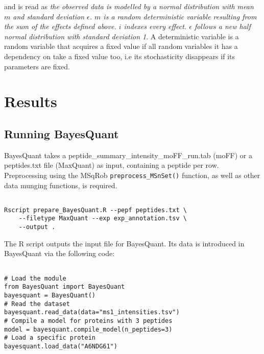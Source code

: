 and is read as \textit{the observed data is modelled by a normal distribution with mean $m$ and standard deviation $\epsilon$. $m$ is a random deterministic variable resulting from the sum of the effects defined above. $i$ indexes every effect. $\epsilon$ follows a new half normal distribution with standard deviation 1}. A deterministic variable is a random variable that acquires a fixed value if all random variables it has a dependency on take a fixed value too, i.e its stochasticity disappears if its parameters are fixed.

\section{Results}


\subsection{Running BayesQuant}

BayesQuant takes a peptide\_summary\_intensity\_moFF\_run.tab (moFF) or a peptides.txt file (MaxQuant) as input, containing a peptide per row. Preprocessing using the MSqRob \texttt{preprocess\_MSnSet()} function, as well as other data munging functions, is required.


\begin{verbatim}

Rscript prepare_BayesQuant.R --pepf peptides.txt \
    --filetype MaxQuant --exp exp_annotation.tsv \
    --output .
\end{verbatim}

The R script outputs the input file for BayesQuant. Its data is introduced in BayesQuant via the following code:

\begin{verbatim}

# Load the module
from BayesQuant import BayesQuant
bayesquant = BayesQuant()
# Read the dataset
bayesquant.read_data(data="ms1_intensities.tsv")
# Compile a model for proteins with 3 peptides
model = bayesquant.compile_model(n_peptides=3)
# Load a specific protein
bayesquant.load_data("A6NDG61")
\end{verbatim}

